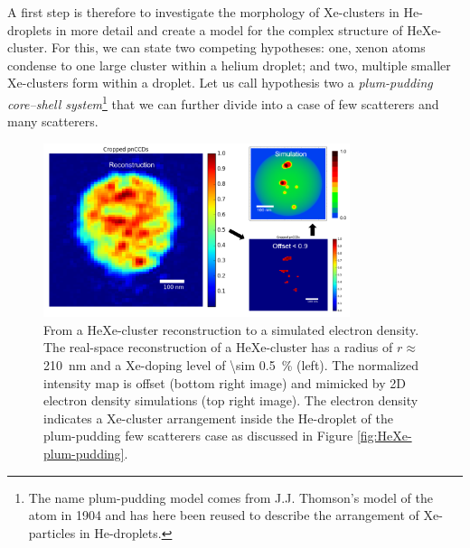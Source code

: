 %
A first step is therefore to investigate the morphology of Xe-clusters in He-droplets in more detail and create a model for the complex structure of HeXe-cluster. For this, we can state two competing hypotheses: one, xenon atoms condense to one large cluster within a helium droplet; and two, multiple smaller Xe-clusters form within a droplet. Let us call hypothesis two a \textit{plum-pudding core--shell system}\footnote{The name plum-pudding model comes from J.J. Thomson's model of the atom in 1904 and has here been reused to describe the arrangement of Xe-particles in He-droplets.} that we can further divide into a case of few scatterers and many scatterers.\\[1\baselineskip]
%
\begin{figure}
 	\centering
 		\includegraphics[width=0.80\textwidth]{images/results/reconstructions-to-simulations_new.png}
 	\caption[From a HeXe-cluster reconstruction to a simulated electron density.]{From a HeXe-cluster reconstruction to a simulated electron density. The real-space reconstruction of a HeXe-cluster has a radius of $r\approx$ \SI{210}{\nano\meter} and a Xe-doping level of \SI{\sim 0.5}{\percent} (left). The normalized intensity map is offset (bottom right image) and mimicked by 2D electron density simulations (top right image). The electron density indicates a Xe-cluster arrangement inside the He-droplet of the plum-pudding few scatterers case as discussed in Figure \ref{fig:HeXe-plum-pudding}.}
 	\label{fig:HeXe-cluster-60}
\end{figure}
